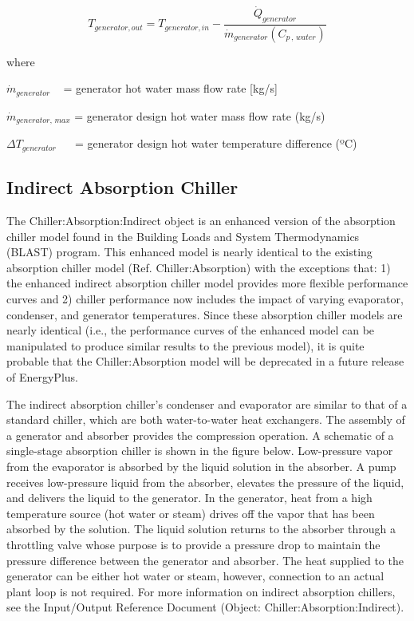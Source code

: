 \begin{equation}
{T_{generator,out}} = {T_{generator,in}} - \frac{{{{\dot Q}_{generator}}}}{{{{\dot m}_{generator}}\left( {{C_{p\,,\,water}}} \right)}}
\end{equation}

where

\({\dot m_{generator}}\) ~ = generator hot water mass flow rate {[}kg/s{]}

\({\dot m_{generator,\,max}}\) = generator design hot water mass flow rate (kg/s)

\(\Delta {T_{generator}}\) ~~ = generator design hot water temperature difference (ºC)

\subsection{Indirect Absorption Chiller}\label{indirect-absorption-chiller}

The Chiller:Absorption:Indirect object is an enhanced version of the absorption chiller model found in the Building Loads and System Thermodynamics (BLAST) program. This enhanced model is nearly identical to the existing absorption chiller model (Ref. Chiller:Absorption) with the exceptions that: 1) the enhanced indirect absorption chiller model provides more flexible performance curves and 2) chiller performance now includes the impact of varying evaporator, condenser, and generator temperatures. Since these absorption chiller models are nearly identical (i.e., the performance curves of the enhanced model can be manipulated to produce similar results to the previous model), it is quite probable that the Chiller:Absorption model will be deprecated in a future release of EnergyPlus.

The indirect absorption chiller's condenser and evaporator are similar to that of a standard chiller, which are both water-to-water heat exchangers. The assembly of a generator and absorber provides the compression operation. A schematic of a single-stage absorption chiller is shown in the figure below. Low-pressure vapor from the evaporator is absorbed by the liquid solution in the absorber. A pump receives low-pressure liquid from the absorber, elevates the pressure of the liquid, and delivers the liquid to the generator. In the generator, heat from a high temperature source (hot water or steam) drives off the vapor that has been absorbed by the solution. The liquid solution returns to the absorber through a throttling valve whose purpose is to provide a pressure drop to maintain the pressure difference between the generator and absorber. The heat supplied to the generator can be either hot water or steam, however, connection to an actual plant loop is not required. For more information on indirect absorption chillers, see the Input/Output Reference Document (Object: Chiller:Absorption:Indirect).

